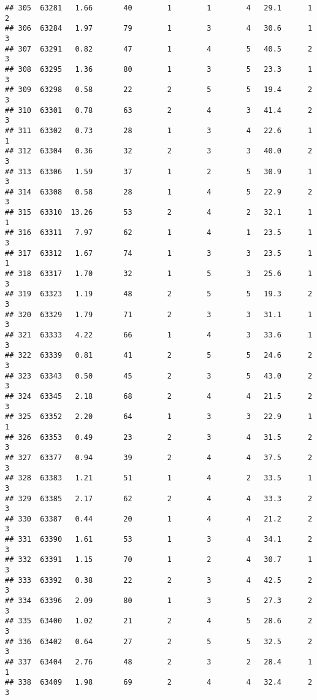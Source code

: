 \documentclass[
]{article}
\begin{document}
\begin{verbatim}
## 305  63281   1.66       40        1        1        4   29.1      1      2
## 306  63284   1.97       79        1        3        4   30.6      1      3
## 307  63291   0.82       47        1        4        5   40.5      2      3
## 308  63295   1.36       80        1        3        5   23.3      1      3
## 309  63298   0.58       22        2        5        5   19.4      2      3
## 310  63301   0.78       63        2        4        3   41.4      2      3
## 311  63302   0.73       28        1        3        4   22.6      1      1
## 312  63304   0.36       32        2        3        3   40.0      2      3
## 313  63306   1.59       37        1        2        5   30.9      1      3
## 314  63308   0.58       28        1        4        5   22.9      2      3
## 315  63310  13.26       53        2        4        2   32.1      1      1
## 316  63311   7.97       62        1        4        1   23.5      1      3
## 317  63312   1.67       74        1        3        3   23.5      1      1
## 318  63317   1.70       32        1        5        3   25.6      1      3
## 319  63323   1.19       48        2        5        5   19.3      2      3
## 320  63329   1.79       71        2        3        3   31.1      1      3
## 321  63333   4.22       66        1        4        3   33.6      1      3
## 322  63339   0.81       41        2        5        5   24.6      2      3
## 323  63343   0.50       45        2        3        5   43.0      2      3
## 324  63345   2.18       68        2        4        4   21.5      2      3
## 325  63352   2.20       64        1        3        3   22.9      1      1
## 326  63353   0.49       23        2        3        4   31.5      2      3
## 327  63377   0.94       39        2        4        4   37.5      2      3
## 328  63383   1.21       51        1        4        2   33.5      1      3
## 329  63385   2.17       62        2        4        4   33.3      2      3
## 330  63387   0.44       20        1        4        4   21.2      2      3
## 331  63390   1.61       53        1        3        4   34.1      2      3
## 332  63391   1.15       70        1        2        4   30.7      1      3
## 333  63392   0.38       22        2        3        4   42.5      2      3
## 334  63396   2.09       80        1        3        5   27.3      2      3
## 335  63400   1.02       21        2        4        5   28.6      2      3
## 336  63402   0.64       27        2        5        5   32.5      2      3
## 337  63404   2.76       48        2        3        2   28.4      1      1
## 338  63409   1.98       69        2        4        4   32.4      2      3

\end{verbatim}
\end{document}

